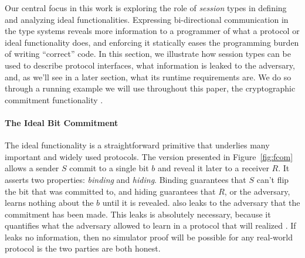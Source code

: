 
Our central focus in this work is exploring the role of \emph{session} types in defining and analyzing ideal functionalities.
Expressing bi-directional communication in the type systems reveals more information to a programmer of what a protocol or ideal functionality does, and enforcing it statically eases the programming burden of writing ``correct'' code.
In this section, we illustrate how session types can be used to describe protocol interfaces, what information is leaked to the adversary, and, as we'll see in a later section, what its runtime requirements are.
We do so through a running example we will use throughout this paper, the cryptographic commitment functionality \Fcom.

\paragraph{The Ideal Bit Commitment}
The ideal functionality \Fcom is a straightforward primitive that underlies many important and widely used protocols. 
The version presented in Figure~\ref{fig:fcom} allows a sender $S$ commit to a single bit $b$ and reveal it later to a receiver $R$.
It asserts two properties: \emph{binding} and \emph{hiding}.
Binding guarantees that $S$ can't flip the bit that was committed to, and hiding guarantees that $R$, or the adversary, learns nothing about the $b$ until it is revealed.
\Fcom also leaks to the adversary that the commitment has been made.
This leaks is absolutely necessary, because it quantifies what the adversary allowed to learn in a protocol that will realized \Fcom. 
If \Fcom leaks no information, then no simulator proof will be possible for any real-world protocol is the two parties are both honest.

\begin{figure}
\centering
\begin{subfigure}{.5\textwidth}

\end{subfigure}%
\begin{subfigure}{.5\textwidth}

\end{subfigure}%
\\[2ex]
\begin{subfigure}{\linewidth}

\end{subfigure}
\\[2ex]
\begin{subfigure}{\linewidth}

\end{subfigure}
\end{figure}

